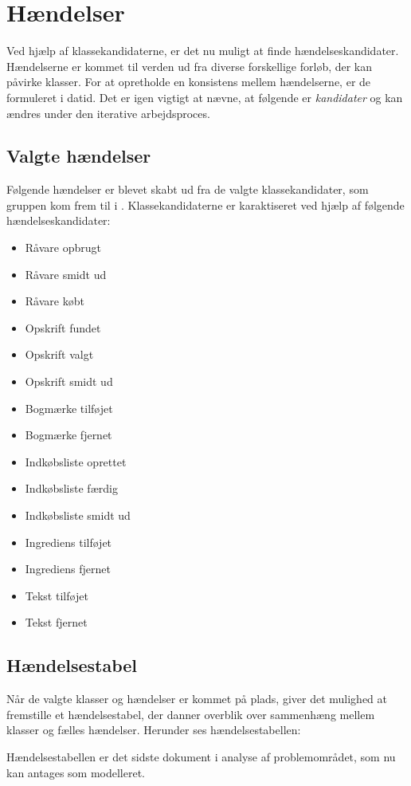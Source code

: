 \section{Hændelser}
\label{sec:haendelser}
Ved hjælp af klassekandidaterne, er det nu muligt at finde hændelseskandidater. Hændelserne er kommet til verden ud fra diverse forskellige forløb, der kan påvirke klasser. For at opretholde en konsistens mellem hændelserne, er de formuleret i datid. Det er igen vigtigt at nævne, at følgende er \emph{kandidater} og kan ændres under den iterative arbejdsproces. 

\subsection{Valgte hændelser}
Følgende hændelser er blevet skabt ud fra de valgte klassekandidater, som gruppen kom frem til i . Klassekandidaterne er karaktiseret ved hjælp af følgende hændelseskandidater: 

\begin{itemize} [noitemsep]
\item Råvare opbrugt
\item Råvare smidt ud
\item Råvare købt
\item Opskrift fundet
\item Opskrift valgt
\item Opskrift smidt ud
\item Bogmærke tilføjet
\item Bogmærke fjernet
\item Indkøbsliste oprettet
\item Indkøbsliste færdig
\item Indkøbsliste smidt ud
\item Ingrediens tilføjet
\item Ingrediens fjernet
\item Tekst tilføjet
\item Tekst fjernet
\end{itemize}

\subsection{Hændelsestabel}
Når de valgte klasser og hændelser er kommet på plads, giver det mulighed at fremstille et hændelsestabel, der danner overblik over sammenhæng mellem klasser og fælles hændelser. Herunder ses hændelsestabellen:



Hændelsestabellen er det sidste dokument i analyse af problemområdet, som nu kan antages som modelleret. 

